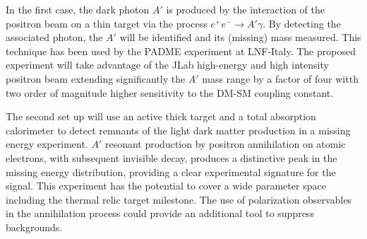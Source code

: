 In the first case, the dark photon $A'$ is produced by the interaction of the positron beam on a thin target via the process $e^+ e^- \rightarrow A' \gamma$. By detecting the associated photon, the $A'$ will be identified and its (missing) mass measured. This technique has been used by the PADME experiment at LNF-Italy. The proposed experiment will take advantage of the JLab high-energy and high intensity positron beam extending significantly the $A'$ mass range by a factor of four witth two order of magnitude higher sensitivity to the DM-SM coupling constant. 

The second set up  will use an active thick target and a total absorption calorimeter to detect remnants of the light dark matter production in a missing energy experiment.  $A'$ resonant production by positron annihilation on atomic electrons, with subsequent invisible decay, produces a distinctive peak in the missing energy distribution, providing a clear experimental signature for the signal. This experiment has the potential to  cover a wide parameter space including the thermal relic target milestone.  The use of polarization observables in the annihilation process could provide an additional tool to suppress backgrounds. 
